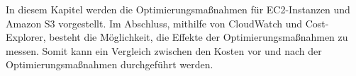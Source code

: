 In diesem Kapitel werden die Optimierungsmaßnahmen für EC2-Instanzen und Amazon S3 vorgestellt. Im Abschluss, mithilfe von CloudWatch und Cost-Explorer, besteht die Möglichkeit, die Effekte der Optimierungsmaßnahmen zu messen. Somit kann ein Vergleich zwischen den Kosten vor und nach der Optimierungsmaßnahmen durchgeführt werden.

